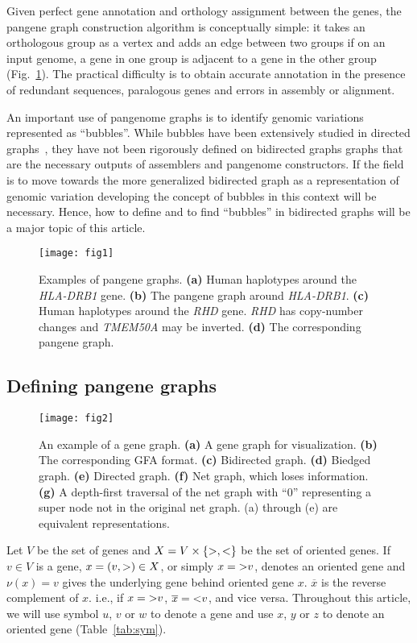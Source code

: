 \documentclass[webpdf,contemporary,large,namedate]{oup-authoring-template}%
\begin{document}
Given perfect gene annotation and orthology assignment between the genes, the pangene graph construction algorithm is conceptually simple:
it takes an orthologous group as a vertex and adds an edge between two groups
if on an input genome, a gene in one group is adjacent to a gene in the other group (Fig.~\ref{fig:ex1}).
The practical difficulty is to obtain accurate annotation in the presence of redundant sequences, paralogous genes and errors in assembly or alignment.

An important use of pangenome graphs is to identify genomic variations represented as ``bubbles''.
While bubbles have been extensively studied in directed graphs~\citep{DBLP:conf/wabi/OnoderaSS13},
they have not been rigorously defined on bidirected graphs graphs that are the necessary outputs of assemblers and pangenome constructors.
If the field is to move towards the more generalized bidirected graph as a representation of genomic variation developing the concept of bubbles in this context will be necessary.
Hence, how to define and to find ``bubbles'' in bidirected graphs will be a major topic of this article.

\begin{figure}[b!]
\centering
\texttt{[image: fig1]}
\caption{Examples of pangene graphs. {\bf (a)} Human haplotypes around the
\emph{HLA-DRB1} gene. {\bf (b)} The pangene graph around \emph{HLA-DRB1}. {\bf
(c)} Human haplotypes around the \emph{RHD} gene. \emph{RHD} has copy-number
changes and \emph{TMEM50A} may be inverted. {\bf (d)} The corresponding pangene
graph.}\label{fig:ex1}
\end{figure}

\subsection{Defining pangene graphs}

\begin{figure}[t!]
\centering
\texttt{[image: fig2]}
\caption{An example of a gene graph. {\bf (a)} A gene graph for visualization.
{\bf (b)} The corresponding GFA format.
{\bf (c)} Bidirected graph.
{\bf (d)} Biedged graph.
{\bf (e)} Directed graph.
{\bf (f)} Net graph, which loses information.
{\bf (g)} A depth-first traversal of the net graph with ``0'' representing a super node
not in the original net graph.
(a) through (e) are equivalent representations.}\label{fig:exa1}
\end{figure}

Let $V$ be the set of genes
and $X=V\times\{{\rm >},{\rm <}\}$ be the set of oriented genes.
If $v\in V$ is a gene, $x=(v,{\rm >})\in X$, or simply $x={\rm >}v$, denotes an oriented gene
and $\nu(x)=v$ gives the underlying gene behind oriented gene $x$.
$\overline{x}$ is the reverse complement of $x$.
i.e., if $x={\rm >}v$, $\overline{x}={\rm <}v$, and vice versa.
Throughout this article, we will use symbol $u$, $v$ or $w$ to denote a gene
and use $x$, $y$ or $z$ to denote an oriented gene (Table~\ref{tab:sym}).
\end{document}
